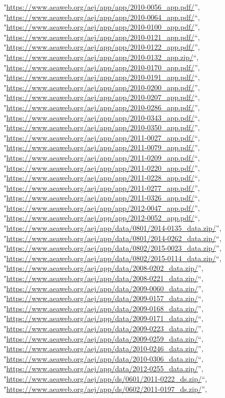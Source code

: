 \documentclass[]{article}
\begin{document}
\begin{itemize}
  "\url{https://www.aeaweb.org/aej/app/app/2010-0056_app.pdf/}'',
  "\url{https://www.aeaweb.org/aej/app/app/2010-0064_app.pdf/}``,
  "\url{https://www.aeaweb.org/aej/app/app/2010-0100_app.pdf/}'',
  "\url{https://www.aeaweb.org/aej/app/app/2010-0121_app.pdf/}``,
  "\url{https://www.aeaweb.org/aej/app/app/2010-0122_app.pdf/}'',
  "\url{https://www.aeaweb.org/aej/app/app/2010-0132_app.zip/}``,
  "\url{https://www.aeaweb.org/aej/app/app/2010-0170_app.pdf/}'',
  "\url{https://www.aeaweb.org/aej/app/app/2010-0191_app.pdf/}``,
  "\url{https://www.aeaweb.org/aej/app/app/2010-0200_app.pdf/}'',
  "\url{https://www.aeaweb.org/aej/app/app/2010-0207_app.pdf/}``,
  "\url{https://www.aeaweb.org/aej/app/app/2010-0286_app.pdf/}'',
  "\url{https://www.aeaweb.org/aej/app/app/2010-0343_app.pdf/}``,
  "\url{https://www.aeaweb.org/aej/app/app/2010-0350_app.pdf/}'',
  "\url{https://www.aeaweb.org/aej/app/app/2011-0027_app.pdf/}``,
  "\url{https://www.aeaweb.org/aej/app/app/2011-0079_app.pdf/}'',
  "\url{https://www.aeaweb.org/aej/app/app/2011-0209_app.pdf/}``,
  "\url{https://www.aeaweb.org/aej/app/app/2011-0220_app.pdf/}'',
  "\url{https://www.aeaweb.org/aej/app/app/2011-0228_app.pdf/}``,
  "\url{https://www.aeaweb.org/aej/app/app/2011-0277_app.pdf/}'',
  "\url{https://www.aeaweb.org/aej/app/app/2011-0326_app.pdf/}``,
  "\url{https://www.aeaweb.org/aej/app/app/2012-0047_app.pdf/}'',
  "\url{https://www.aeaweb.org/aej/app/app/2012-0052_app.pdf/}``,
  "\url{https://www.aeaweb.org/aej/app/data/0801/2014-0135_data.zip/}'',
  "\url{https://www.aeaweb.org/aej/app/data/0801/2014-0262_data.zip/}``,
  "\url{https://www.aeaweb.org/aej/app/data/0802/2015-0023_data.zip/}'',
  "\url{https://www.aeaweb.org/aej/app/data/0802/2015-0114_data.zip/}``,
  "\url{https://www.aeaweb.org/aej/app/data/2008-0202_data.zip/}'',
  "\url{https://www.aeaweb.org/aej/app/data/2008-0221_data.zip/}``,
  "\url{https://www.aeaweb.org/aej/app/data/2009-0060_data.zip/}'',
  "\url{https://www.aeaweb.org/aej/app/data/2009-0157_data.zip/}``,
  "\url{https://www.aeaweb.org/aej/app/data/2009-0168_data.zip/}'',
  "\url{https://www.aeaweb.org/aej/app/data/2009-0171_data.zip/}``,
  "\url{https://www.aeaweb.org/aej/app/data/2009-0223_data.zip/}'',
  "\url{https://www.aeaweb.org/aej/app/data/2009-0259_data.zip/}``,
  "\url{https://www.aeaweb.org/aej/app/data/2010-0246_data.zip/}'',
  "\url{https://www.aeaweb.org/aej/app/data/2010-0306_data.zip/}``,
  "\url{https://www.aeaweb.org/aej/app/data/2012-0255_data.zip/}'',
  "\url{https://www.aeaweb.org/aej/app/ds/0601/2011-0222_ds.zip/}``,
  "\url{https://www.aeaweb.org/aej/app/ds/0602/2011-0197_ds.zip/}'',

\end{itemize}
\end{document}

